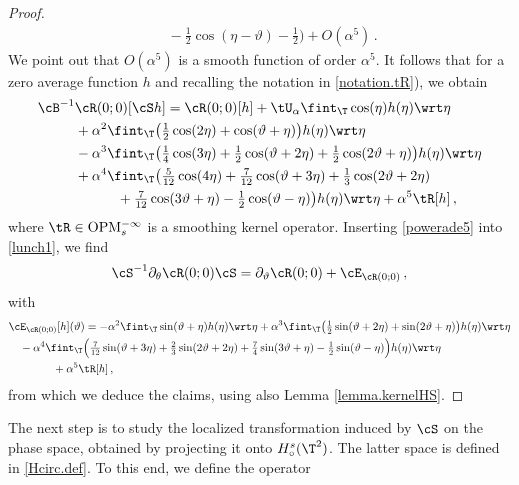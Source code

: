 \documentclass[a4paper,reqno,10pt]{article}
\newcommand{\pa}{\partial}
\newcommand{\OpM}{{\rm O}{\rm P}{\rm M}}
\begin{document}
\begin{proof}
\begin{align}
& \quad- \tfrac12 \cos(\eta-\vartheta) -\tfrac12 \Big)   + O(\alpha^5) \,.
	\end{align}
	We point out that $O(\alpha^5)$ is a smooth function of order $\alpha^5.$ 
It follows that  for a zero average function $h$ and recalling the notation in \ref{notation.tR}), we obtain
	\begin{align}
		\cB^{-1} & \cR(0;0) [\cS h]  = \cR(0;0)[h]  + \tU_{\alpha} \fint_{\T} \cos(\eta) h(\eta) \wrt\eta \\
		&+ \alpha^2 \fint_{\T}\big( \tfrac12\cos(2\eta) + \cos(\vartheta+\eta)\big)h(\eta)  \wrt\eta \\
		& -\alpha^3\fint_{\T} \big( \tfrac14\cos(3\eta) + \tfrac12 \cos(\vartheta+2\eta)+ \tfrac12 \cos(2\vartheta + \eta ) \big) h(\eta) \wrt\eta  \\
		&  +\alpha^4 \fint_{\T} \big(  \tfrac{5}{12}\cos(4\eta) + \tfrac{7}{12} \cos(\vartheta+3\eta)+ \tfrac{1}{3} \cos(2\vartheta+2\eta) \\
		& \quad \quad \quad + \tfrac{7}{12}\cos(3\vartheta+\eta) - \tfrac12  \cos(\vartheta-\eta)\big) h(\eta) \wrt\eta  + \alpha^5 \tR[h] \,,\label{powerade5}
	\end{align}
	where $\tR \in \OpM_{s}^{-\infty}$ is a smoothing kernel operator.
Inserting \eqref{powerade5} into \eqref{lunch1}, we find
\begin{equation}
	\cS^{-1} \pa_{\theta} \cR(0;0) \cS = \pa_{\vartheta} \cR(0;0) + \cE_{\cR(0;0)} \,,
\end{equation}
with
	\begin{align}
		&	\cE_{\cR(0;0)}[h](\vartheta)  =- \alpha^2\fint_{\T}\sin(\vartheta+\eta)  h(\eta) \wrt \eta   +\alpha^3 \fint_{\T}\big( \tfrac12\sin(\vartheta+2\eta) + \sin(2\vartheta+\eta) \big)h(\eta) \wrt \eta    \\
		& \quad-\alpha^4\fint_{\T} \Big( \tfrac{7}{12}\sin(\vartheta+3\eta) + \tfrac{2}{3} \sin(2\vartheta+2\eta) + \tfrac{7}{4} \sin(3\vartheta+\eta)  -\tfrac12\sin(\vartheta-\eta) \Big)h(\eta) \wrt\eta  \\
      &\qquad\qquad + \alpha^5 \tR[h]\,,
	\end{align}
	from which we deduce the claims, using also Lemma \ref{lemma.kernelHS}.
\end{proof}
The next step is to study the localized transformation induced by $\cS$ on the phase space, obtained by projecting it onto $H_{\circ}^{s}(\T^2)$. The latter space is defined in \eqref{Hcirc.def}. To this end, we define the operator
\end{document}
